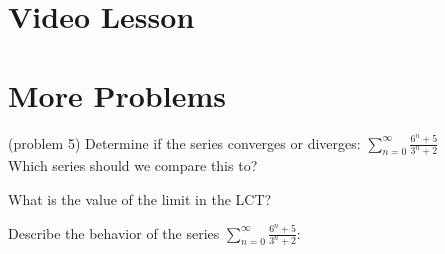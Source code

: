 \documentclass[handout]{ximera}
\begin{document}
\section{Video Lesson}

\begin{center}
\begin{foldable}
\end{foldable}
\end{center}


\section{More Problems}


\begin{problem}(problem 5)
Determine if the series converges or diverges: $\displaystyle{\sum_{n=0}^\infty \frac{6^n + 5}{3^n + 2}}$\\
Which series should we compare this to?

\begin{multipleChoice}
\end{multipleChoice}

What is the value of the limit in the LCT?
\begin{multipleChoice}
\end{multipleChoice}

Describe the behavior of the series $\displaystyle{\sum_{n=0}^\infty \frac{6^n + 5}{3^n + 2}:}$
\begin{multipleChoice}
\end{multipleChoice}

\end{problem}
\end{document}
